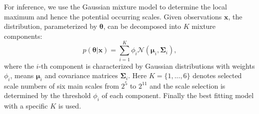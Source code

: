 \documentclass[10pt,twocolumn,letterpaper]{article}
\begin{document}
For inference, we use the Gaussian mixture model to determine the local maximum and hence the potential occurring scales.  
Given observations $\bm{x}$, the distribution, parameterized by $\bm{\theta}$, can be decomposed into $K$ mixture components:
\begin{equation}
 p(\bm{\theta} | \bm{x}) = \sum_{i=1}^K \phi_i \mathcal{N} (\bm{\mu}_i, \bm{\Sigma}_i),
\end{equation}
where the $i$-th component is characterized by Gaussian distributions with weights $\phi _i$, means $\bm{\mu}_i$ and covariance matrices $\bm{\Sigma}_i$. Here $K=\{1,...,6\}$ denotes selected scale numbers of six main scales from $2^5$ to $2^{11}$ and the scale selection is determined by the threshold $\phi _i$ of each component. Finally the best fitting model with a specific $K$ is used. 
%




\end{document}
